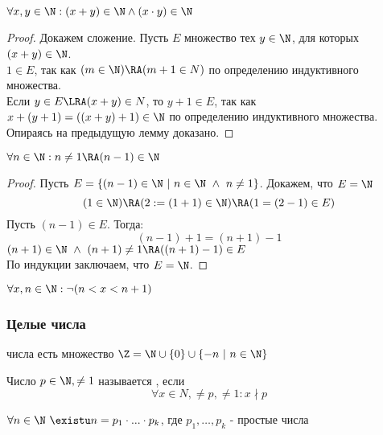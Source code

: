 \documentclass[a4paper, 14pt]{article}
\begin{document}
    \begin{theorem}
        $\forall x,y \in \N: (x + y) \in \N \land (x \cdot y) \in \N$
    \end{theorem}
    \begin{proof}
        Докажем сложение. Пусть $E$ множество тех $y \in \N$, для которых
        $(x + y) \in \N$. \\
        $1 \in E$, так как $(m \in \N) \RA (m + 1 \in N)$ по определению индуктивного
        множества. \\
        Если $y \in E \LRA (x+y) \in N$, то $y + 1 \in E$, так как
        $x + (y + 1) = ((x + y) + 1) \in \N$ по определению индуктивного
        множества. \\
        Опираясь на предыдущую лемму доказано.
    \end{proof}

    \begin{theorem}
        $\forall n \in \N : n \neq 1 \RA (n-1) \in \N$
    \end{theorem}
    \begin{proof}
        Пусть $E = \{(n-1) \in \N \ \vert \ n \in \N \ \land \ n \neq 1\}$. Докажем, что $E = \N$ \\
        \[(1 \in \N) \RA (2 := (1 + 1) \in \N) \RA (1 = (2 - 1) \in E)\]
        Пусть $(n-1) \in E$. Тогда:
        \[(n-1)+1 = (n+1)-1\]
        $(n+1) \in \N \ \land \ (n+1) \neq 1 \RA ((n+1) - 1) \in E$
        \\ По индукции заключаем, что $E=\N$.
    \end{proof}

    \begin{theorem}
        $\forall x, n \in \N : \lnot(n < x < n + 1)$
    \end{theorem}

    \subsubsection*{Целые числа}
    \begin{definition}
        { числа} есть множество $\Z = \N \cup \{0\} \cup \{-n \ \vert \ n \in \N\}$
    \end{definition}

    \begin{definition}
        Число $p \in \N, \neq 1$ называется {}, если 
        \[\forall x \in N, \neq p, \neq 1: x \nmid p\]
    \end{definition}

    \begin{theorem}
        $\forall n \in \N \ \existu n = p_1 \cdot ... \cdot p_k$, где $p_1, \dots, p_k$ - простые числа
    \end{theorem}
\end{document}
